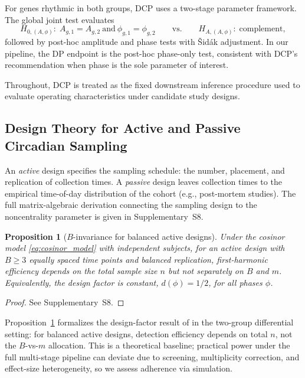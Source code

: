 \documentclass{article}
\newtheorem{proposition}{Proposition}[section]
\begin{document}
For genes rhythmic in both groups, DCP uses a two-stage parameter framework.
The global joint test evaluates
\begin{equation}
H_{0,(A,\phi)}:\; A_{g,1}=A_{g,2}\ \text{and}\ \phi_{g,1}=\phi_{g,2}
\qquad \text{vs.} \qquad
H_{A,(A,\phi)}:\; \text{complement},
\label{eq:dp_hyp}
\end{equation}
followed by post-hoc amplitude and phase tests with \v{S}id\'{a}k adjustment.
In our pipeline, the DP endpoint is the post-hoc phase-only test, consistent
with DCP’s recommendation when phase is the sole parameter of interest.

Throughout, DCP is treated as the fixed downstream inference procedure used to
evaluate operating characteristics under candidate study designs.

\subsection{Design Theory for Active and Passive Circadian Sampling}
\label{sec:design_theory}

An \emph{active} design specifies the sampling schedule: the number,
placement, and replication of collection times. A \emph{passive} design
leaves collection times to the empirical time-of-day distribution of the
cohort (e.g., post-mortem studies). The full matrix-algebraic derivation
connecting the sampling design to the noncentrality parameter is given in
Supplementary~S8.

\begin{proposition}[$B$-invariance for balanced active designs]
\label{prop:b_invariance}
Under the cosinor model \eqref{eq:cosinor_model} with independent subjects, for
an active design with $B\geq 3$ equally spaced time points and balanced
replication, first-harmonic efficiency depends on the total sample size $n$ but
not separately on $B$ and $m$. Equivalently, the design factor is constant,
$d(\phi)=1/2$, for all phases $\phi$.
\end{proposition}

\begin{proof}
See Supplementary~S8.
\end{proof}

Proposition~\ref{prop:b_invariance} formalizes the design-factor result of
\citet{zong2023circapower} in the two-group differential setting: for balanced
active designs, detection efficiency depends on total $n$, not the $B$-vs-$m$
allocation. This is a theoretical baseline; practical power under the full
multi-stage pipeline can deviate due to screening, multiplicity correction, and
effect-size heterogeneity, so we assess adherence via simulation.
\end{document}
